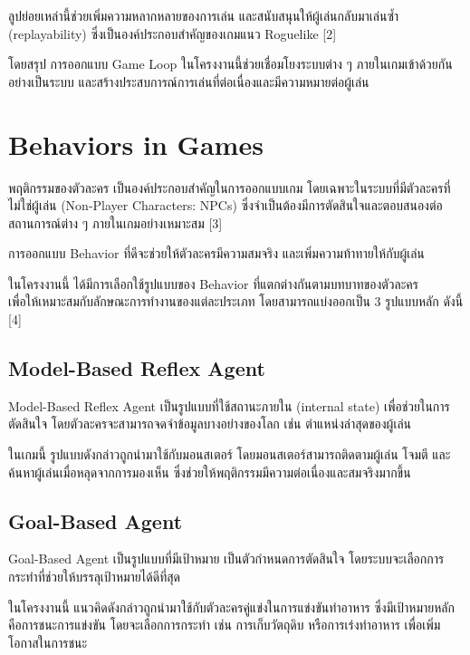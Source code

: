 ลูปย่อยเหล่านี้ช่วยเพิ่มความหลากหลายของการเล่น และสนับสนุนให้ผู้เล่นกลับมาเล่นซ้ำ (replayability) ซึ่งเป็นองค์ประกอบสำคัญของเกมแนว Roguelike [2]

โดยสรุป การออกแบบ Game Loop ในโครงงานนี้ช่วยเชื่อมโยงระบบต่าง ๆ ภายในเกมเข้าด้วยกันอย่างเป็นระบบ และสร้างประสบการณ์การเล่นที่ต่อเนื่องและมีความหมายต่อผู้เล่น

\section{Behaviors in Games}
\hspace{1.5em}พฤติกรรมของตัวละคร เป็นองค์ประกอบสำคัญในการออกแบบเกม โดยเฉพาะในระบบที่มีตัวละครที่\\ไม่ใช่ผู้เล่น (Non-Player Characters: NPCs) ซึ่งจำเป็นต้องมีการตัดสินใจและตอบสนองต่อสถานการณ์ต่าง ๆ ภายในเกมอย่างเหมาะสม [3]

การออกแบบ Behavior ที่ดีจะช่วยให้ตัวละครมีความสมจริง และเพิ่มความท้าทายให้กับผู้เล่น

ในโครงงานนี้ ได้มีการเลือกใช้รูปแบบของ Behavior ที่แตกต่างกันตามบทบาทของตัวละคร \\เพื่อให้เหมาะสมกับลักษณะการทำงานของแต่ละประเภท โดยสามารถแบ่งออกเป็น 3 รูปแบบหลัก ดังนี้ [4]
\newpage
\subsection{Model-Based Reflex Agent}
\hspace{1.5em}Model-Based Reflex Agent เป็นรูปแบบที่ใช้สถานะภายใน (internal state) เพื่อช่วยในการ\\ตัดสินใจ โดยตัวละครจะสามารถจดจำข้อมูลบางอย่างของโลก เช่น ตำแหน่งล่าสุดของผู้เล่น

ในเกมนี้ รูปแบบดังกล่าวถูกนำมาใช้กับมอนสเตอร์ โดยมอนสเตอร์สามารถติดตามผู้เล่น โจมตี และค้นหาผู้เล่นเมื่อหลุดจากการมองเห็น ซึ่งช่วยให้พฤติกรรมมีความต่อเนื่องและสมจริงมากขึ้น

\subsection{Goal-Based Agent}
\hspace{1.5em}Goal-Based Agent เป็นรูปแบบที่มีเป้าหมาย เป็นตัวกำหนดการตัดสินใจ โดยระบบจะเลือกการ\\กระทำที่ช่วยให้บรรลุเป้าหมายได้ดีที่สุด

ในโครงงานนี้ แนวคิดดังกล่าวถูกนำมาใช้กับตัวละครคู่แข่งในการแข่งขันทำอาหาร ซึ่งมีเป้าหมายหลักคือการชนะการแข่งขัน โดยจะเลือกการกระทำ เช่น การเก็บวัตถุดิบ หรือการเร่งทำอาหาร เพื่อเพิ่มโอกาสในการชนะ

